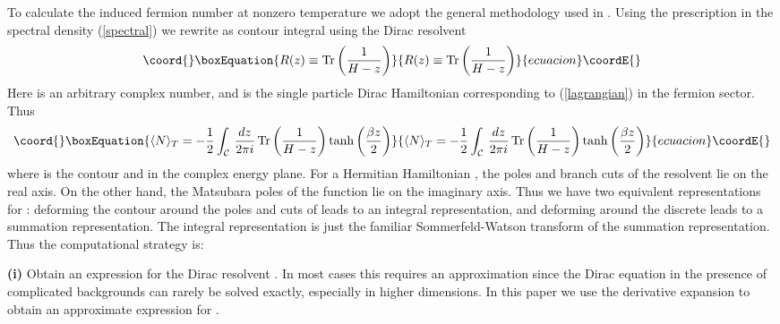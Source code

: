 \documentclass[a4paper,prd,showpacs,showkeys]{revtex4}
\begin{document}
To calculate the induced fermion number at nonzero temperature we adopt the general methodology used in \cite{dunneian}. Using the \coordHE{} prescription in the spectral density (\ref{spectral}) we rewrite \coordHE{} as contour integral using the Dirac resolvent
\begin{equation}\coord{}\boxEquation{
R(z) \equiv \textrm{Tr}\left( \frac{1}{H-z}\right)
\label{resolvent}
}{
R(z) \equiv \textrm{Tr}\left( \frac{1}{H-z}\right)
}{ecuacion}\coordE{}\end{equation}
Here \coordHE{} is an arbitrary complex number, and \coordHE{} is the single particle Dirac Hamiltonian corresponding to (\ref{lagrangian}) in the fermion sector. Thus
\begin{equation}\coord{}\boxEquation{
\langle N\rangle _T=-\frac{1}{2}\int _{\mathcal{C}}\, \frac{dz}{2 \pi i} \, \textrm{Tr} \left(\frac{1}{H-z}\right) \tanh \left(\frac{\beta z}{2}\right)
\label{contour}
}{
\langle N\rangle _T=-\frac{1}{2}\int _{\mathcal{C}}\, \frac{dz}{2 \pi i} \, \textrm{Tr} \left(\frac{1}{H-z}\right) \tanh \left(\frac{\beta z}{2}\right)
}{ecuacion}\coordE{}\end{equation}
where \coordHE{} is the contour \coordHE{} and \coordHE{} in the
complex energy plane.  For a Hermitian Hamiltonian \coordHE{}, the poles and
branch cuts of the resolvent lie on the real axis. On the other hand,
the Matsubara poles \coordHE{} of the \coordHE{} function lie on the imaginary axis. Thus we have two
equivalent representations for \coordHE{} :  deforming
the contour \coordHE{} around the poles and cuts of \coordHE{} leads to
an integral representation, and deforming \coordHE{} around the
discrete \coordHE{} leads to a summation representation. The integral
representation is just the familiar Sommerfeld-Watson transform of the
summation representation. Thus the computational strategy is:

{\bf (i)} Obtain an expression for the Dirac resolvent \coordHE{}.  In most cases this requires an approximation since the Dirac equation in the presence of complicated backgrounds can rarely be solved exactly, especially in higher dimensions. In this paper we use the derivative expansion to obtain an approximate expression for \coordHE{}.
\end{document}
